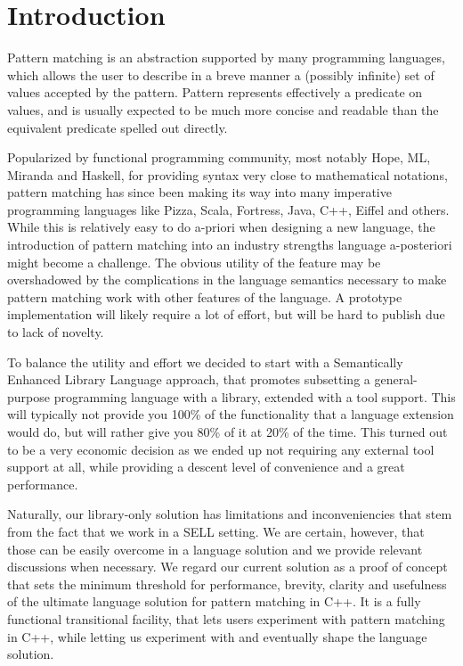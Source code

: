 \documentclass[preprint]{sigplanconf}
\begin{document}
\section{Introduction} %
\label{sec:intro}


Pattern matching is an abstraction supported by many programming languages, which 
allows the user to describe in a breve manner a (possibly infinite) set of 
values accepted by the pattern. Pattern represents effectively a predicate on 
values, and is usually expected to be much more concise and readable than the 
equivalent predicate spelled out directly.

Popularized by functional programming community, most notably Hope\cite{BMS80}, 
ML\cite{ML90}, Miranda\cite{Miranda85} and Haskell\cite{Haskell98Book}, for 
providing syntax very close to mathematical notations, pattern matching has 
since been making its way into many imperative programming languages like 
Pizza\cite{Odersky97pizzainto}, Scala\cite{Scala2nd}, Fortress\cite{RPS10}, 
Java\cite{Liu03jmatch:iterable,HydroJ2003}, C++\cite{Prop96}, 
Eiffel\cite{Moreau:2003} and others. While this is relatively
easy to do a-priori when designing a new language, the introduction of pattern 
matching into an industry strengths language a-posteriori might become a 
challenge. The obvious utility of the feature may be overshadowed by the 
complications in the language semantics necessary to make pattern matching work 
with other features of the language. A prototype implementation will likely 
require a lot of effort, but will be hard to publish due to lack of novelty.

To balance the utility and effort we decided to start with a Semantically 
Enhanced Library Language\cite{SELL} approach, that promotes subsetting a 
general-purpose programming language with a library, extended with a tool 
support. This will typically not provide you 100\% of the functionality that a 
language extension would do, but will rather give you 80\% of it at 20\% of the 
time. This turned out to be a very economic decision as we ended up not requiring 
any external tool support at all, while providing a descent level of convenience 
and a great performance.

Naturally, our library-only solution has limitations and inconveniencies that 
stem from the fact that we work in a SELL setting. We are certain, however, that 
those can be easily overcome in a language solution and we provide relevant 
discussions when necessary. We regard our current solution as a proof of  
concept that sets the minimum threshold for performance, brevity, clarity and 
usefulness of the ultimate language solution for pattern matching in C++. It is 
a fully functional transitional facility, that lets users experiment with 
pattern matching in C++, while letting us experiment with and eventually shape 
the language solution.
\end{document}
